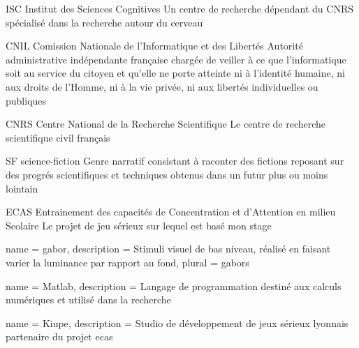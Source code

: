   {ISC}
  {Institut des Sciences Cognitives}
  {Un centre de recherche dépendant du \gls{CNRS} spécialisé dans la recherche autour du cerveau}

  {CNIL}
  {Comission Nationale de l'Informatique et des Libertés}
  {Autorité administrative indépendante française chargée de veiller à ce que l’informatique soit au service du citoyen et qu’elle ne porte atteinte ni à l’identité humaine, ni aux droits de l’Homme, ni à la vie privée, ni aux libertés individuelles ou publiques}

  {CNRS}
  {Centre National de la Recherche Scientifique}
  {Le centre de recherche scientifique civil français}

  {SF}
  {science-fiction}
  {Genre narratif consistant à raconter des fictions reposant sur des progrés scientifiques et techniques obtenus dans un futur plus ou moins lointain}

  {ECAS}
  {Entrainement des capacités de Concentration et d'Attention en milieu Scolaire}
  {Le projet de jeu sérieux sur lequel est basé mon stage} 

 {
  name = gabor,
  description = {Stimuli visuel de bas niveau, réalisé en faisant varier la luminance par rapport au fond},
  plural = gabors
}


 {
  name = Matlab,
  description = {Langage de programmation destiné aux calculs numériques et utilisé dans la recherche}
}

 {
  name = Kiupe,
  description = {Studio de développement de jeux sérieux lyonnais partenaire du projet \gls{ecas}}
}